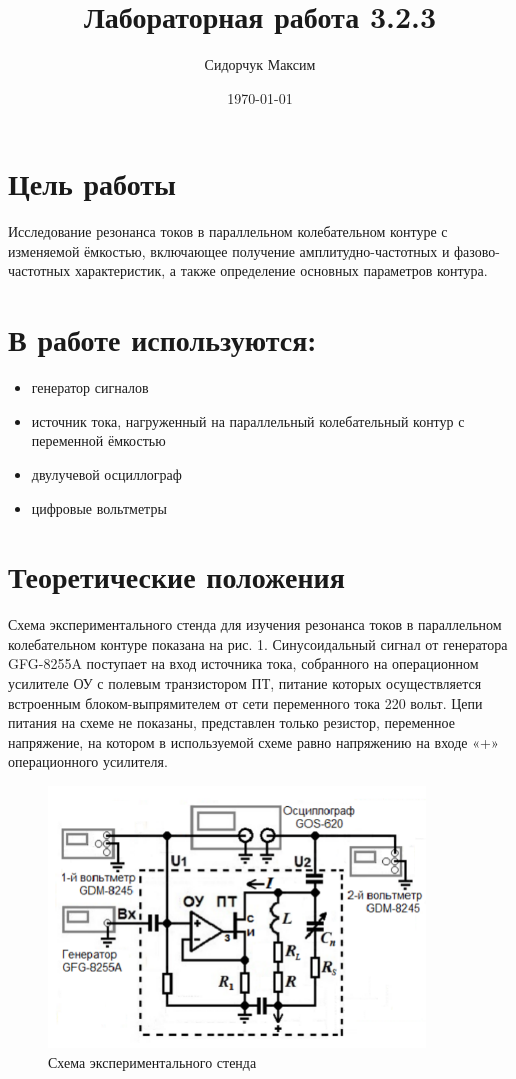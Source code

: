 \documentclass[a4paper]{article}
\date{\today}
\title{Лабораторная работа 3.2.3}
\author{Сидорчук Максим}
\begin{document}
\maketitle

\section{Цель работы}

Исследование резонанса токов в параллельном колебательном контуре с изменяемой ёмкостью, включающее получение амплитудно-частотных и фазово-частотных характеристик, а также определение основных параметров контура.

\section{В работе используются:}
\begin{itemize}
    \item генератор сигналов
    \item источник тока, нагруженный на параллельный колебательный контур с переменной ёмкостью
    \item двулучевой осциллограф
    \item цифровые вольтметры
\end{itemize}


\section{Теоретические положения}

Схема экспериментального стенда для изучения резонанса токов в параллельном колебательном контуре показана на рис. 1. Синусоидальный сигнал от генератора GFG-8255A поступает на вход источника тока, собранного на операционном усилителе ОУ с полевым транзистором ПТ, питание которых осуществляется встроенным блоком-выпрямителем от сети переменного тока 220 вольт. Цепи питания на схеме не показаны, представлен только резистор, переменное напряжение, на котором в используемой схеме равно напряжению на входе «+» операционного усилителя. \\

\begin{figure}[h]
    \centering
    \includegraphics[width=10cm]{fig1.png}
    \caption{Схема экспериментального стенда}
    \label{fig:vac}
\end{figure}
\end{document}
